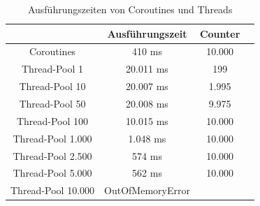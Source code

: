\documentclass[11pt]{article}
\begin{document}
    \begin{table}[h!]
        \centering
        \begin{tabular}{|c|c|c|c|}
            \hline
             & \textbf{Ausführungszeit} & \textbf{Counter}\\
            \hline
            Coroutines & 410 ms & 10.000   \\
            \hline
            Thread-Pool 1 & 20.011 ms  & 199  \\
            \hline
            Thread-Pool 10 & 20.007 ms  & 1.995  \\
            \hline
            Thread-Pool 50 & 20.008 ms  & 9.975  \\
            \hline
            Thread-Pool 100 & 10.015 ms  & 10.000  \\
            \hline
            Thread-Pool 1.000 & 1.048 ms  & 10.000  \\
            \hline
            Thread-Pool 2.500 & 574 ms  & 10.000  \\
            \hline
            Thread-Pool 5.000 & 562 ms  & 10.000  \\
            \hline
            Thread-Pool 10.000 & OutOfMemoryError  &   \\
            \hline
        \end{tabular}
        \caption{Ausführungszeiten von Coroutines und Threads}
        \label{tab:coroutine-thread-pool}
    \end{table}
    
\end{document}
